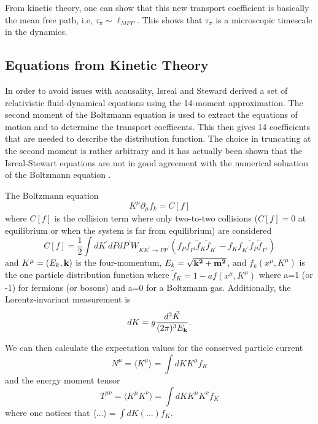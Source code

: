 \documentclass[aps,article]{revtex4}
\begin{document}
From kinetic theory, one can show that this new transport coefficient is basically the mean free path, i.e, $\tau_\pi \sim \ell_{MFP}$. This shows that $\tau_\pi$ is a microscopic timescale in the dynamics.   

\subsection{Equations from Kinetic Theory}

In order to avoid issues with acausality, Isreal and Steward derived  a set of relativistic fluid-dynamical equations using the 14-moment approximation.  The second moment of the Boltzmann equation is used to extract the equations of motion and to determine the transport coefficents.  This then gives 14 coefficients that are needed to describe the distribution function.  The choice in truncating at the second moment is rather arbitrary and it has actually been shown that the Isreal-Stewart equations are not in good agreement with the numerical soluation of the Boltzmann equation \cite{numboltz}.

The Boltzmann equation
\begin{equation}
K^{\mu}\partial_{\mu}f_k=C[f]
\end{equation}
where $C[f]$ is the collision term where only two-to-two collisions ($C[f]=0$ at equilibrium or when the system is far from equilibrium) are considered
\begin{equation}
C[f]=\frac{1}{2}\int dK^{\prime}dPdP^{\prime}W_{KK^{\prime}\rightarrow PP^{\prime}}\left(f_P f_{P^{\prime}}\tilde{f}_K \tilde{f}_{K^{\prime}}-f_K f_{K^{\prime}}\tilde{f}_P \tilde{f}_{P^{\prime}}\right)
\end{equation}
and $K^{\mu}=\left(E_k,\bf{k}\right)$ is the four-momentum, $E_k=\sqrt{\bf{k}^2+m^2}$, and $f_k\left(x^{\mu},K^{\mu}\right)$ is the one particle distribution function where $\tilde{f}_{K}=1-a f\left(x^{\mu},K^{\mu}\right)$ where a=1 (or -1) for fermions (or bosons) and a=0 for a Boltzmann gas. 
Additionally, the Lorentz-invariant measurement is 
\begin{equation}
dK=g\frac{d^3\vec{K}}{(2\pi)^3 E_{\bf{k}}}.
\end{equation}

We can then calculate the expectation values for the conserved particle current
\begin{equation}\label{eqn:nmuang}
N^{\mu}=\langle K^{\mu}\rangle=\int dK K^{\mu}f_K
\end{equation}
and the energy moment tensor
\begin{equation}\label{eqn:tmunuang}
T^{\mu\nu}=\langle K^{\mu}K^{\nu}\rangle=\int dK K^{\mu}K^{\nu}f_K
\end{equation}
where one notices that $\langle \dots \rangle=\int dK \left(\dots\right) f_K$.
\end{document}
